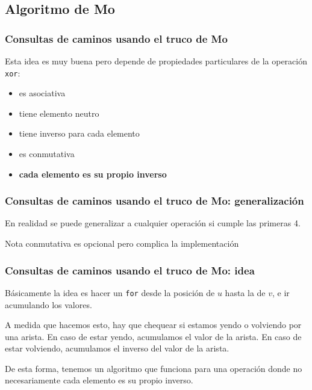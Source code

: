 \subsection{Algoritmo de Mo}

\begin{frame}
  \frametitle{Consultas de caminos usando el truco de Mo}

  Esta idea es muy buena pero depende de propiedades particulares de la operación \texttt{xor}:

  \vspace{0.5em}

  \begin{itemize}
    \item es asociativa
    \item tiene elemento neutro
    \item tiene inverso para cada elemento
    \item es conmutativa
    \item \textbf{cada elemento es su propio inverso}
  \end{itemize}
\end{frame}

\begin{frame}
  \frametitle{Consultas de caminos usando el truco de Mo: generalización}

  En realidad se puede generalizar a cualquier operación si cumple las primeras 4.

  \vspace{0.75em}

  \begin{alertblock}{Nota}
    conmutativa es opcional pero complica la implementación
  \end{alertblock}
\end{frame}

\begin{frame}
  \frametitle{Consultas de caminos usando el truco de Mo: idea}

  Básicamente la idea es hacer un \texttt{for} desde la posición de \(u\) hasta la de \(v\), e ir acumulando los valores.

  \vspace{0.75em}

  A medida que hacemos esto, hay que chequear si estamos yendo o volviendo por una arista. En caso de estar yendo, acumulamos el valor de la arista. En caso de estar volviendo, acumulamos el inverso del valor de la arista.

  \vspace{0.75em}

  De esta forma, tenemos un algoritmo que funciona para una operación donde no necesariamente cada elemento es su propio inverso.
\end{frame}

